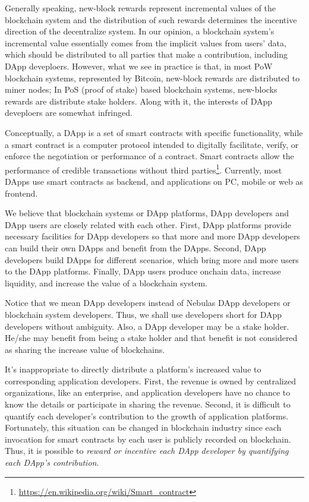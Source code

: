 Generally speaking,  new-block rewards represent incremental values of the blockchain system and the distribution of such rewards determines the incentive direction of the decentralize system. In our opinion, a blockchain system's incremental value essentially comes from the implicit values from users' data, which should be distributed to all parties that make a contribution, including DApp deveploers. However, what we see in practice is that, in most PoW blockchain systems, represented by Bitcoin, new-block rewards are distributed to miner nodes; In PoS (proof of stake) based blockchain systems, new-blocks rewards are distribute stake holders. Along with it, the interests of DApp deveploers are somewhat infringed.

Conceptually, a DApp is a set of smart contracts with specific
functionality, while a smart contract is a computer protocol intended to
digitally facilitate, verify, or enforce the negotiation or performance of a
contract. Smart contracts allow the performance of credible transactions
without third
parties\footnote{\url{https://en.wikipedia.org/wiki/Smart\_contract}}.
Currently, most DApps use smart contracts as backend, and applications on PC,
mobile or web as frontend.

We believe that blockchain systems or DApp platforms, DApp developers and DApp
users are closely related with each other. First, DApp platforms provide
necessary facilities for DApp developers so that more and more DApp developers
can build their own DApps and benefit from the DApps. Second, DApp
developers build DApps for different scenarios, which bring more and more
users to the DApp platforms. Finally, DApp users produce onchain data,
increase liquidity, and increase the value of a blockchain system.

Notice that we mean DApp developers instead of Nebulas DApp developers or
blockchain system developers. Thus, we shall use developers short for DApp
developers without ambiguity. Also, a DApp developer may be a stake holder.
He/she may benefit from being a stake holder and that benefit is not considered
as sharing the increase value of blockchains.


It's inappropriate to directly distribute a platform's increased value to
corresponding application developers. First, the revenue is owned by
centralized organizations, like an enterprise, and application developers have
no chance to know the details or participate in sharing the revenue. Second, it
is difficult to quantify each developer's contribution to the growth of
application platforms. Fortunately, this situation can be changed in blockchain
industry since each invocation for smart contracts by each user is
publicly recorded on
blockchain. Thus, it is possible to \emph{reward or incentive each DApp developer by
quantifying each DApp's contribution}.

